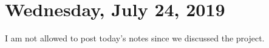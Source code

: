 \section{Wednesday, July 24, 2019}
I am not allowed to post today's notes since we discussed the project. 